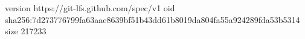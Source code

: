 version https://git-lfs.github.com/spec/v1
oid sha256:7d273776799fa63aae8639bf51b43dd61b8019da804fa55a924289fda53b5314
size 217233
